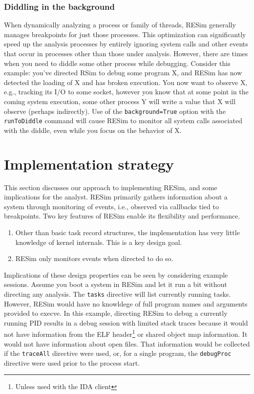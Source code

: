 \documentclass[titlepage]{article}
\begin{document}
\subsubsection{Diddling in the background}
\label{background_diddle}
When dynamically analyzing a process or family of threads, RESim generally manages breakpoints for just those processes.
This optimization can significantly speed up the analysis processes by entirely ignoring system calls and other events
that occur in processes other than those under analysis.  However, there are times when you need to diddle some other
process while debugging.  Consider this example: you've directed RSim to debug some program X, and RESim has now detected
the loading of X and has broken execution.  You now want to observe X, e.g., tracking its I/O to some socket, however you
know that at some point in the coming system execution, some other process Y will write a value that X will observe (perhaps
indirectly).  Use of the {\tt background=True} option with the {\tt runToDiddle} command will cause RESim to monitor all
system calls associated with the diddle, even while you focus on the behavior of X. 

\section{Implementation strategy}
This section discusses our approach to implementing RESim, and some implications for the analyst.
RESim primarily gathers information about a system through monitoring of events, i.e., observed via callbacks tied to 
breakpoints.  Two key features of RESim enable its flexibility and performance.  
\begin{enumerate}
\item Other than basic task record structures, the implementation has very little knowledge of kernel internals.
This is a key design goal.  
\item RESim only monitors events when directed to do so.
\end{enumerate}
\noindent Implications of these design properties can be seen by considering example sessions.  Assume you boot a system in RESim and let it run a bit without
directing any analysis.  The {\tt tasks} directive will list currently running tasks.  However, RESim would have no knowldege of full program names and arguments
provided to execve.  In this example, directing RESim to debug a currently running PID results in a debug session with limited stack traces because
it would not have information from the ELF header\footnote{Unless used with the IDA client}  or shared object map information.  It would not have
information about open files.
That information would be collected if the {\tt traceAll} directive were used, or, for a single program, the {\tt debugProc} directive were used prior to the
process start.
\end{document}
